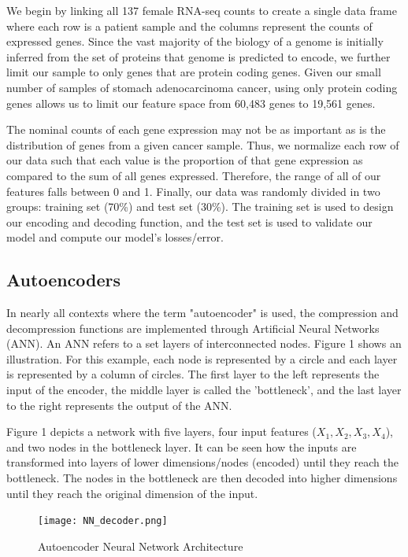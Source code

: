 \documentclass{article}
\begin{document}
We begin by linking all 137 female RNA-seq counts to create a single data frame where each row is a patient sample and the columns represent the counts of expressed genes. Since the vast majority of the biology of a genome is initially inferred from the set of proteins that genome is predicted to encode, we further limit our sample to only genes that are protein coding genes. Given our small number of samples of stomach adenocarcinoma cancer, using only protein coding genes allows us to limit our feature space from 60,483 genes to 19,561 genes. 

The nominal counts of each gene expression may not be as important as is the distribution of genes from a given cancer sample. Thus, we normalize each row of our data such that each value is the proportion of that gene expression as compared to the sum of all genes expressed. Therefore, the range of all of our features falls between 0 and 1. Finally, our data was randomly divided in two groups: training set (70\%) and test set (30\%). The training set is used to design our encoding and decoding function, and the test set is used to validate our model and compute our model's losses/error.   


\subsection{Autoencoders}

In nearly all contexts where the term "autoencoder" is used, the compression and decompression functions are implemented through Artificial Neural Networks (ANN). An ANN refers to a set layers of interconnected nodes. Figure 1 shows an illustration. For this example, each node is represented by a circle and each layer is represented by a column of circles. The first layer to the left represents the input of the encoder, the middle layer is called the 'bottleneck', and the last layer to the right represents the output of the ANN. 

Figure 1 depicts a network with five layers, four input features (\begin{math}X_1, X_2, X_3, X_4\end{math}), and two nodes in the bottleneck layer. It can be seen how the inputs are transformed into layers of lower dimensions/nodes (encoded) until they reach the bottleneck. The nodes in the bottleneck are then decoded into higher dimensions until they reach the original dimension of the input. 

\begin{figure}[h]
\texttt{[image: NN\_decoder.png]}
\centering
\caption{Autoencoder Neural Network Architecture}
\end{figure}
\end{document}
